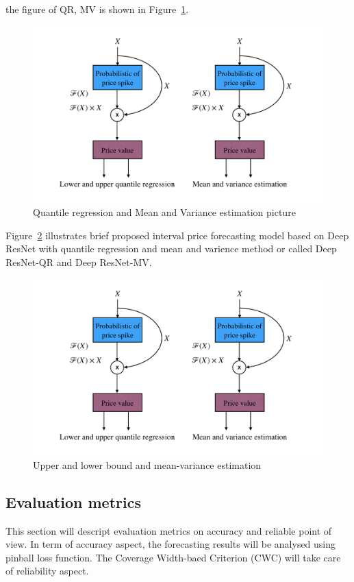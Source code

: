 \documentclass[review]{elsarticle}
\begin{document}
      the figure of QR, MV is shown in Figure~\ref{Fig:QR_MV_picture}.

      \begin{figure}[H]
        \includegraphics[width=12cm]{UB_LB_MV_PDRNN}
        \caption{Quantile regression and Mean and Variance estimation picture}
        \label{Fig:QR_MV_picture}
        \centering
      \end{figure}


      Figure~\ref{Fig:UB_LB_MV_PDRNN} illustrates brief proposed interval price forecasting model based on Deep ResNet with quantile regression and mean and varience method or called Deep ResNet-QR and Deep ResNet-MV.

      \begin{figure}[H]
        \includegraphics[width=12cm]{UB_LB_MV_PDRNN}
        \caption{Upper and lower bound and mean-variance estimation}
        \label{Fig:UB_LB_MV_PDRNN}
        \centering
      \end{figure}

    \subsection{Evaluation metrics}
      This section will descript evaluation metrics on accuracy and reliable point of view.
      In term of accuracy aspect, the forecasting results will be analysed using pinball loss function.
      The Coverage Width-baed Criterion (CWC) will take care of reliability aspect.
\end{document}
